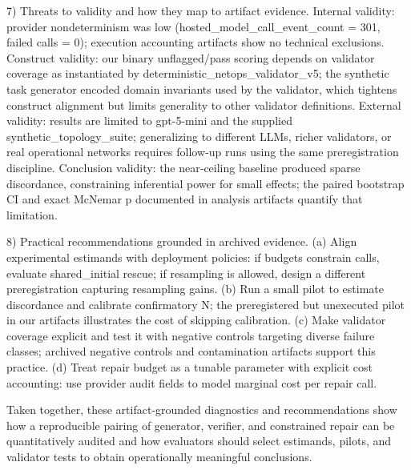\documentclass[conference]{IEEEtran}
\begin{document}
7) Threats to validity and how they map to artifact evidence. Internal validity: provider nondeterminism was low (hosted\_model\_call\_event\_count = 301, failed calls = 0); execution accounting artifacts show no technical exclusions. Construct validity: our binary unflagged/pass scoring depends on validator coverage as instantiated by deterministic\_netops\_validator\_v5; the synthetic task generator encoded domain invariants used by the validator, which tightens construct alignment but limits generality to other validator definitions. External validity: results are limited to gpt-5-mini and the supplied synthetic\_topology\_suite; generalizing to different LLMs, richer validators, or real operational networks requires follow‑up runs using the same preregistration discipline. Conclusion validity: the near‑ceiling baseline produced sparse discordance, constraining inferential power for small effects; the paired bootstrap CI and exact McNemar p documented in analysis artifacts quantify that limitation.

8) Practical recommendations grounded in archived evidence. (a) Align experimental estimands with deployment policies: if budgets constrain calls, evaluate shared\_initial rescue; if resampling is allowed, design a different preregistration capturing resampling gains. (b) Run a small pilot to estimate discordance and calibrate confirmatory N; the preregistered but unexecuted pilot in our artifacts illustrates the cost of skipping calibration. (c) Make validator coverage explicit and test it with negative controls targeting diverse failure classes; archived negative controls and contamination artifacts support this practice. (d) Treat repair budget as a tunable parameter with explicit cost accounting: use provider audit fields to model marginal cost per repair call.

Taken together, these artifact‑grounded diagnostics and recommendations show how a reproducible pairing of generator, verifier, and constrained repair can be quantitatively audited and how evaluators should select estimands, pilots, and validator tests to obtain operationally meaningful conclusions.
\end{document}

